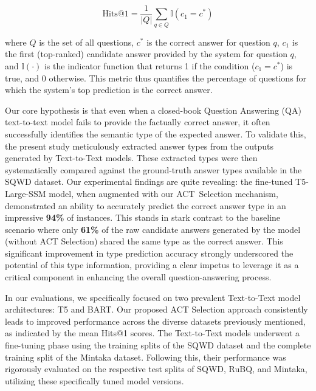 \begin{equation}
    \text{Hits@1} = \frac{1}{|Q|} \sum_{q \in Q} \mathbb{I}(c_1 = c^*)
    \label{eq:act_selection:hits_at_1}
\end{equation}

where $Q$ is the set of all questions, $c^*$ is the correct answer for question $q$, $c_1$ is the first (top-ranked) candidate answer provided by the system for question $q$, and $\mathbb{I}(\cdot)$ is the indicator function that returns 1 if the condition ($c_1 = c^*$) is true, and 0 otherwise. This metric thus quantifies the percentage of questions for which the system's top prediction is the correct answer.

Our core hypothesis is that even when a closed-book Question Answering (QA) text-to-text model fails to provide the factually correct answer, it often successfully identifies the semantic type of the expected answer. To validate this, the present study meticulously extracted answer types from the outputs generated by Text-to-Text models. These extracted types were then systematically compared against the ground-truth answer types available in the SQWD dataset. Our experimental findings are quite revealing: the fine-tuned T5-Large-SSM model, when augmented with our ACT~Selection mechanism, demonstrated an ability to accurately predict the correct answer type in an impressive \textbf{94\%} of instances. This stands in stark contrast to the baseline scenario where only \textbf{61\%} of the raw candidate answers generated by the model (without ACT Selection) shared the same type as the correct answer. This significant improvement in type prediction accuracy strongly underscored the potential of this type information, providing a clear impetus to leverage it as a critical component in enhancing the overall question-answering process.
   


In our evaluations, we specifically focused on two prevalent Text-to-Text model architectures: T5 and BART. Our proposed ACT Selection approach consistently leads to improved performance across the diverse datasets previously mentioned, as indicated by the mean Hits@1 scores. The Text-to-Text models underwent a fine-tuning phase using the training splits of the SQWD dataset and the complete training split of the Mintaka dataset. Following this, their performance was rigorously evaluated on the respective test splits of SQWD, RuBQ, and Mintaka, utilizing these specifically tuned model versions.

